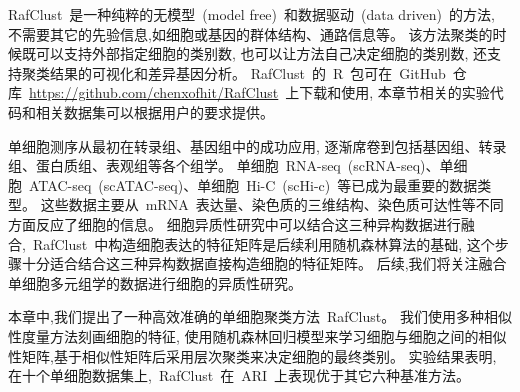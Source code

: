 RafClust~是一种纯粹的无模型~(model free)~和数据驱动~(data driven)~的方法,
不需要其它的先验信息,如细胞或基因的群体结构、通路信息等。
该方法聚类的时候既可以支持外部指定细胞的类别数, 也可以让方法自己决定细胞的类别数,
还支持聚类结果的可视化和差异基因分析。
RafClust~的~R~包可在~GitHub~仓库~\url{https://github.com/chenxofhit/RafClust}~上下载和使用,
本章节相关的实验代码和相关数据集可以根据用户的要求提供。

单细胞测序从最初在转录组、基因组中的成功应用, 逐渐席卷到包括基因组、转录组、蛋白质组、表观组等各个组学。
单细胞~RNA-seq~(scRNA-seq)、单细胞~ATAC-seq~(scATAC-seq)、单细胞~Hi-C~(scHi-c)~等已成为最重要的数据类型。
这些数据主要从~mRNA~表达量、染色质的三维结构、染色质可达性等不同方面反应了细胞的信息。
细胞异质性研究中可以结合这三种异构数据进行融合,~RafClust~中构造细胞表达的特征矩阵是后续利用随机森林算法的基础,
这个步骤十分适合结合这三种异构数据直接构造细胞的特征矩阵。
后续,我们将关注融合单细胞多元组学的数据进行细胞的异质性研究。

本章中,我们提出了一种高效准确的单细胞聚类方法~RafClust。
我们使用多种相似性度量方法刻画细胞的特征,
使用随机森林回归模型来学习细胞与细胞之间的相似性矩阵,基于相似性矩阵后采用层次聚类来决定细胞的最终类别。
实验结果表明, 在十个单细胞数据集上,~RafClust~在~ARI~上表现优于其它六种基准方法。


